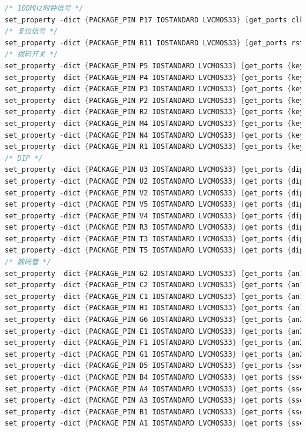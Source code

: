 \documentclass{article}
\begin{document}
\begin{lstlisting}[language=Verilog, caption={约束文件}]
/* 100MHz时钟信号 */
set_property -dict {PACKAGE_PIN P17 IOSTANDARD LVCMOS33} [get_ports clk]
/* 复位信号 */
set_property -dict {PACKAGE_PIN R11 IOSTANDARD LVCMOS33} [get_ports rst]
/* 拨码开关 */
set_property -dict {PACKAGE_PIN P5 IOSTANDARD LVCMOS33} [get_ports {keys[7]}]
set_property -dict {PACKAGE_PIN P4 IOSTANDARD LVCMOS33} [get_ports {keys[6]}]
set_property -dict {PACKAGE_PIN P3 IOSTANDARD LVCMOS33} [get_ports {keys[5]}]
set_property -dict {PACKAGE_PIN P2 IOSTANDARD LVCMOS33} [get_ports {keys[4]}]
set_property -dict {PACKAGE_PIN R2 IOSTANDARD LVCMOS33} [get_ports {keys[3]}]
set_property -dict {PACKAGE_PIN M4 IOSTANDARD LVCMOS33} [get_ports {keys[2]}]
set_property -dict {PACKAGE_PIN N4 IOSTANDARD LVCMOS33} [get_ports {keys[1]}]
set_property -dict {PACKAGE_PIN R1 IOSTANDARD LVCMOS33} [get_ports {keys[0]}]
/* DIP */
set_property -dict {PACKAGE_PIN U3 IOSTANDARD LVCMOS33} [get_ports {dip[7]}]
set_property -dict {PACKAGE_PIN U2 IOSTANDARD LVCMOS33} [get_ports {dip[6]}]
set_property -dict {PACKAGE_PIN V2 IOSTANDARD LVCMOS33} [get_ports {dip[5]}]
set_property -dict {PACKAGE_PIN V5 IOSTANDARD LVCMOS33} [get_ports {dip[4]}]
set_property -dict {PACKAGE_PIN V4 IOSTANDARD LVCMOS33} [get_ports {dip[3]}]
set_property -dict {PACKAGE_PIN R3 IOSTANDARD LVCMOS33} [get_ports {dip[2]}]
set_property -dict {PACKAGE_PIN T3 IOSTANDARD LVCMOS33} [get_ports {dip[1]}]
set_property -dict {PACKAGE_PIN T5 IOSTANDARD LVCMOS33} [get_ports {dip[0]}]
/* 数码管 */
set_property -dict {PACKAGE_PIN G2 IOSTANDARD LVCMOS33} [get_ports {an1[0]}]
set_property -dict {PACKAGE_PIN C2 IOSTANDARD LVCMOS33} [get_ports {an1[1]}]
set_property -dict {PACKAGE_PIN C1 IOSTANDARD LVCMOS33} [get_ports {an1[2]}]
set_property -dict {PACKAGE_PIN H1 IOSTANDARD LVCMOS33} [get_ports {an1[3]}]
set_property -dict {PACKAGE_PIN G6 IOSTANDARD LVCMOS33} [get_ports {an2[3]}]
set_property -dict {PACKAGE_PIN E1 IOSTANDARD LVCMOS33} [get_ports {an2[2]}]
set_property -dict {PACKAGE_PIN F1 IOSTANDARD LVCMOS33} [get_ports {an2[1]}]
set_property -dict {PACKAGE_PIN G1 IOSTANDARD LVCMOS33} [get_ports {an2[0]}]
set_property -dict {PACKAGE_PIN D5 IOSTANDARD LVCMOS33} [get_ports {sseg1[7]}]
set_property -dict {PACKAGE_PIN B4 IOSTANDARD LVCMOS33} [get_ports {sseg1[6]}]
set_property -dict {PACKAGE_PIN A4 IOSTANDARD LVCMOS33} [get_ports {sseg1[5]}]
set_property -dict {PACKAGE_PIN A3 IOSTANDARD LVCMOS33} [get_ports {sseg1[4]}]
set_property -dict {PACKAGE_PIN B1 IOSTANDARD LVCMOS33} [get_ports {sseg1[3]}]
set_property -dict {PACKAGE_PIN A1 IOSTANDARD LVCMOS33} [get_ports {sseg1[2]}]

\end{lstlisting}
\end{document}

